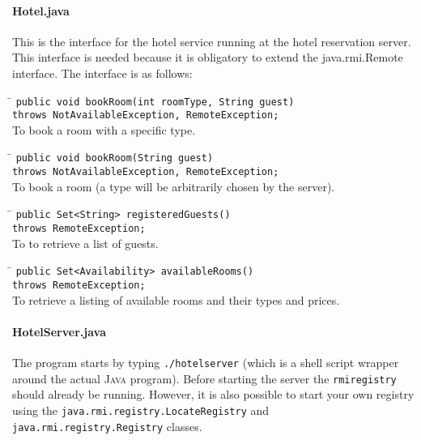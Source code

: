 \documentclass[a4paper,10pt]{article}
\begin{document}
\paragraph{Hotel.java}
This is the interface for the hotel service running at the hotel reservation server. This interface is needed because it is obligatory to extend the java.rmi.Remote interface. The interface is as follows:

\begin{tabbing}
\hspace{20pt}\=\kill
 \> \texttt{publ}\=\texttt{ic void bookRoom(int roomType, String guest)} \+ \\
 \> \texttt{throws NotAvailableException, RemoteException;} \- \\
 \> To book a room with a specific type.
\end{tabbing}

\begin{tabbing}
\hspace{20pt}\=\kill
 \> \texttt{publ}\=\texttt{ic void bookRoom(String guest)} \+\\
 \> \texttt{throws NotAvailableException, RemoteException;} \- \\
 \> To book a room (a type will be arbitrarily chosen by the server).
\end{tabbing}

\begin{tabbing}
\hspace{20pt}\=\kill
 \> \texttt{publ}\=\texttt{ic Set<String> registeredGuests()} \+\\
 \> \texttt{throws RemoteException;} \- \\
 \> To to retrieve a list of guests.
\end{tabbing}

\begin{tabbing}
\hspace{20pt}\=\kill
 \> \texttt{publ}\=\texttt{ic Set<Availability> availableRooms()} \+\\
 \> \texttt{throws RemoteException;} \- \\
 \> To retrieve a listing of available rooms and their types and prices.
\end{tabbing}


\paragraph{HotelServer.java}
The program starts by typing \texttt{./hotelserver} (which is a shell
script wrapper around the actual \textsc{Java} program). Before
starting the server the \texttt{rmiregistry} should already be
running. However, it is also possible to start your own registry using
the \texttt{java.rmi.registry.LocateRegistry} and
\texttt{java.rmi.registry.Registry} classes.
\end{document}
